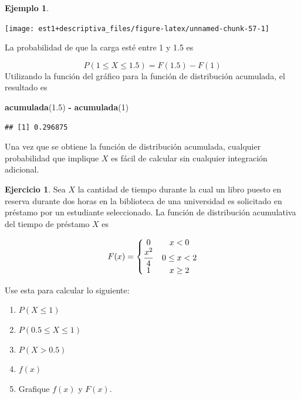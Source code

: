 \documentclass[
  11pt,
]{book}
\newenvironment{Shaded}{\begin{snugshade}}{\end{snugshade}}
\newcommand{\DecValTok}[1]{\textcolor[rgb]{0.00,0.00,0.81}{#1}}
\newcommand{\FloatTok}[1]{\textcolor[rgb]{0.00,0.00,0.81}{#1}}
\newcommand{\FunctionTok}[1]{\textcolor[rgb]{0.13,0.29,0.53}{\textbf{#1}}}
\newcommand{\NormalTok}[1]{#1}
\newcommand{\SpecialCharTok}[1]{\textcolor[rgb]{0.81,0.36,0.00}{\textbf{#1}}}
\providecommand{\tightlist}{%
  \setlength{\itemsep}{0pt}\setlength{\parskip}{0pt}}
\theoremstyle{definition}
\theoremstyle{definition}
\newtheorem{example}{Ejemplo}[chapter]
\theoremstyle{definition}
\newtheorem{exercise}{Ejercicio}[chapter]
\theoremstyle{definition}
\theoremstyle{remark}
\begin{document}
\begin{example}
\begin{center}\texttt{[image: est1+descriptiva\_files/figure-latex/unnamed-chunk-57-1]} \end{center}

La probabilidad de que la carga esté entre 1 y 1.5 es

\[P(1 \leq X \leq 1.5) = F(1.5) - F(1)\]
Utilizando la función del gráfico para la función de distribución acumulada, el resultado es

\begin{Shaded}
\begin{Highlighting}[]
\FunctionTok{acumulada}\NormalTok{(}\FloatTok{1.5}\NormalTok{) }\SpecialCharTok{{-}} \FunctionTok{acumulada}\NormalTok{(}\DecValTok{1}\NormalTok{)}
\end{Highlighting}
\end{Shaded}

\begin{verbatim}
## [1] 0.296875
\end{verbatim}

Una vez que se obtiene la función de distribución acumulada, cualquier probabilidad que implique \(X\) es fácil de calcular sin cualquier integración adicional.
\end{example}

\begin{exercise}

Sea \(X\) la cantidad de tiempo durante la cual un libro puesto en reserva durante dos horas en la biblioteca de una universidad es solicitado en préstamo por un estudiante seleccionado. La función de distribución acumulativa del tiempo de préstamo \(X\) es

\begin{equation}
  \notag
  F(x) = \left\lbrace
  \begin{matrix}
    0 & x<0 \\
    \displaystyle\frac{x^2}{4} & 0\leq x < 2 \\
    1 & x \geq 2\\
  \end{matrix} \right.
\end{equation}

Use esta para calcular lo siguiente:

\begin{enumerate}
\def\labelenumi{\alph{enumi}.}
\tightlist
\item
  \(P(X \leq 1)\)
\item
  \(P(0.5 \leq X \leq 1)\)
\item
  \(P(X > 0.5)\)
\item
  \(f(x)\)
\item
  Grafique \(f(x)\) y \(F(x)\).
\end{enumerate}

\end{exercise}
\end{document}
